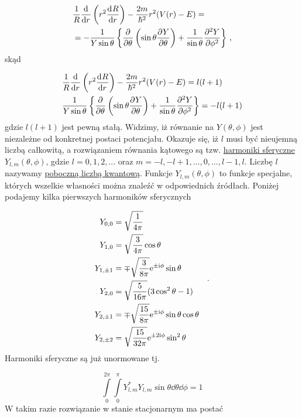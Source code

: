 \documentclass{myclass}
\begin{document}
\begin{equation*}
\begin{split}
&\frac{1}{R}\dv[]{}{r}\left(r^2\dv[]{R}{r}\right)-\frac{2m}{\hbar^2}r^2(V(r)-E)=\\
&=-\frac{1}{Y\sin\theta}\left\{\pdv[]{ }{\theta}\left(\sin\theta\pdv[]{Y}{\theta}\right)+\frac{1}{\sin\theta}\pdv[2]{Y}{\phi}\right\}\,, 
\end{split}
\end{equation*}
skąd

\begin{equation*}
\begin{split}
    &\frac{1}{R}\dv[]{}{r}\left(r^2\dv[]{R}{r}\right)-\frac{2m}{\hbar^2}r^2(V(r)-E)=l(l+1)\\
    &\frac{1}{Y\sin\theta}\left\{\pdv[]{ }{\theta}\left(\sin\theta\pdv[]{Y}{\theta}\right)+\frac{1}{\sin\theta}\pdv[2]{Y}{\phi}\right\}=-l(l+1)
\end{split}
\end{equation*}
gdzie \(l(l+1)\) jest pewną stałą. Widzimy, iż równanie na \(Y(\theta,\phi)\) jest niezależne od
konkretnej postaci potencjału. Okazuje się, iż \(l\) musi być nieujemną liczbą całkowitą, a
rozwiązaniem równania kątowego są tzw. \underline{harmoniki sferyczne \(Y_{l,m}(\theta,\phi)\)},
gdzie \(\boxed{l=0,1,2,...}\) oraz \(\boxed{m=-l,-l+1,...,0,...,l-1,l}\). Liczbę \(l\) nazywamy
\underline{poboczną liczbą kwantową}. Funkcje \(Y_{l,m}(\theta,\phi)\) to funkcje specjalne, których
wszelkie własności można znaleźć w odpowiednich źródłach. Poniżej podajemy kilka pierwszych
harmoników sferycznych

\begin{equation*}
\begin{split}
Y_{0,0}&=\sqrt{\frac{1}{4\pi}}\\
Y_{1,0}&=\sqrt{\frac{3}{4\pi}}\cos\theta\\
Y_{1,\pm1}&=\mp\sqrt{\frac{3}{8\pi}}\mathrm{e}^{\pm\mathrm{i}\phi}\sin\theta\\
Y_{2,0}&=\sqrt{\frac{5}{16\pi}}(3\cos^2\theta-1)\\
Y_{2,\pm1}&=\mp\sqrt{\frac{15}{8\pi}}\mathrm{e}^{\pm\mathrm{i}\phi}\sin\theta\cos\theta\\
Y_{2,\pm2}&=\sqrt{\frac{15}{32\pi}}\mathrm{e}^{\pm2\mathrm{i}\phi}\sin^2\theta\\
\end{split}\quad.
\end{equation*}
Harmoniki sferyczne są już unormowane tj.

\begin{equation*}
\int\limits_{0}^{2\pi}\int\limits_{0}^\pi Y_{l,m}^*Y_{l,m}\sin\theta\dd{\theta}\dd{\phi}=1
\end{equation*}
W takim razie rozwiązanie w stanie stacjonarnym ma postać
\end{document}
